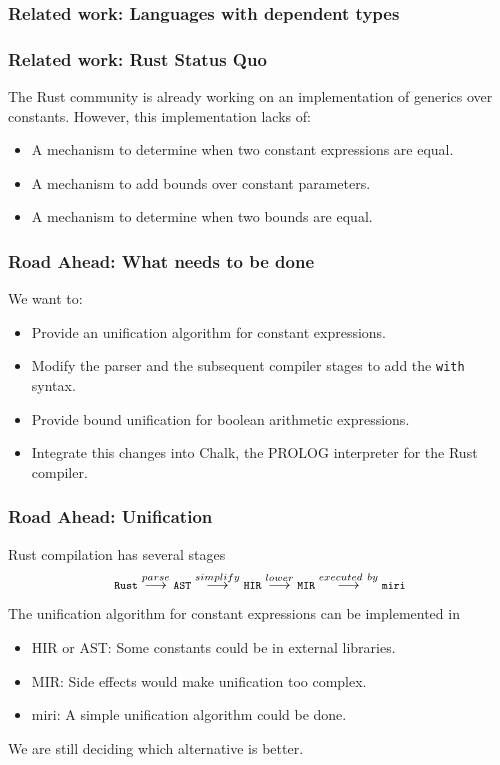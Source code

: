 \documentclass{beamer}
\newcommand{\code}[1] {\texttt{\footnotesize #1}}
\begin{document}
\begin{frame}[fragile]
    \frametitle{Related work: Languages with dependent types}
\end{frame}

\begin{frame}[fragile]
    \frametitle{Related work: Rust Status Quo}
    The Rust community is already working on an implementation of generics over constants. However, this implementation lacks of:
    \begin{itemize}
        \item A mechanism to determine when two constant expressions are equal.
        \item A mechanism to add bounds over constant parameters.
        \item A mechanism to determine when two bounds are equal.
    \end{itemize}

\end{frame}

\begin{frame}[fragile]
    \frametitle{Road Ahead: What needs to be done}
    We want to:
    \begin{itemize}
        \item Provide an unification algorithm for constant expressions.
        \item Modify the parser and the subsequent compiler stages to add the \code{with} syntax.
        \item Provide bound unification for boolean arithmetic expressions.
        \item Integrate this changes into Chalk, the PROLOG interpreter for the Rust compiler.
    \end{itemize}
\end{frame}

\begin{frame}[fragile]
    \frametitle{Road Ahead: Unification}
    Rust compilation has several stages
    $$\code{Rust} \overset{parse}{\longrightarrow} \code{AST} \overset{simplify}{\longrightarrow} \code{HIR} \overset{lower}{\longrightarrow} \code{MIR} \overset{executed\ by}{\longrightarrow} \code{miri}$$
    The unification algorithm for constant expressions can be implemented in
    \begin{itemize}
        \item HIR or AST: Some constants could be in external libraries.
        \item MIR: Side effects would make unification too complex. 
        \item miri: A simple unification algorithm could be done.
    \end{itemize}
    We are still deciding which alternative is better.
\end{frame}
\end{document}
